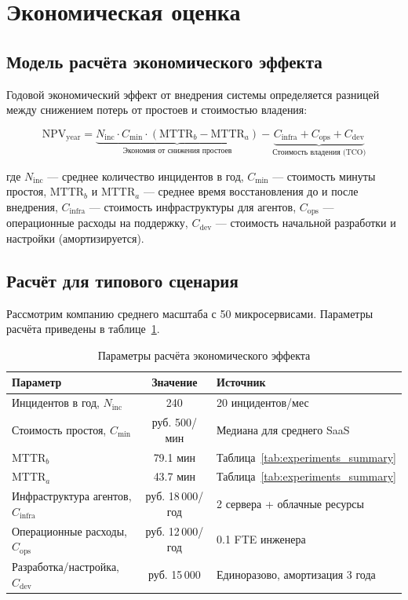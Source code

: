 \section{Экономическая оценка}

\subsection{Модель расчёта экономического эффекта}

Годовой экономический эффект от внедрения системы определяется разницей между снижением потерь от простоев и стоимостью владения:

\begin{equation}
\text{NPV}_{\text{year}} = \underbrace{N_{\text{inc}} \cdot C_{\min} \cdot (\text{MTTR}_b - \text{MTTR}_a)}_{\text{Экономия от снижения простоев}} - \underbrace{C_{\text{infra}} + C_{\text{ops}} + C_{\text{dev}}}_{\text{Стоимость владения (TCO)}}
\label{eq:economic_npv}
\end{equation}

где $N_{\text{inc}}$ --- среднее количество инцидентов в год, $C_{\min}$ --- стоимость минуты простоя, $\text{MTTR}_b$ и $\text{MTTR}_a$ --- среднее время восстановления до и после внедрения, $C_{\text{infra}}$ --- стоимость инфраструктуры для агентов, $C_{\text{ops}}$ --- операционные расходы на поддержку, $C_{\text{dev}}$ --- стоимость начальной разработки и настройки (амортизируется).

\subsection{Расчёт для типового сценария}

Рассмотрим компанию среднего масштаба с 50 микросервисами. Параметры расчёта приведены в таблице~\ref{tab:economic_params}.

\begin{table}[H]
\centering
\small
\caption{Параметры расчёта экономического эффекта}
\label{tab:economic_params}
\begin{tabular}{|p{6cm}|c|p{5.5cm}|}
\hline
\textbf{Параметр} & \textbf{Значение} & \textbf{Источник} \\
\hline
Инцидентов в год, $N_{\text{inc}}$ & 240 & 20 инцидентов/мес \\
\hline
Стоимость простоя, $C_{\min}$ & руб. 500/мин & Медиана для среднего SaaS \cite{amazon_outage_cost} \\
\hline
$\text{MTTR}_b$ & 79.1 мин & Таблица~\ref{tab:experiments_summary} \\
\hline
$\text{MTTR}_a$ & 43.7 мин & Таблица~\ref{tab:experiments_summary} \\
\hline
Инфраструктура агентов, $C_{\text{infra}}$ & руб. 18\,000/год & 2 сервера + облачные ресурсы \\
\hline
Операционные расходы, $C_{\text{ops}}$ & руб. 12\,000/год & 0.1 FTE инженера \\
\hline
Разработка/настройка, $C_{\text{dev}}$ & руб. 15\,000 & Единоразово, амортизация 3 года \\
\hline
\end{tabular}
\end{table}

